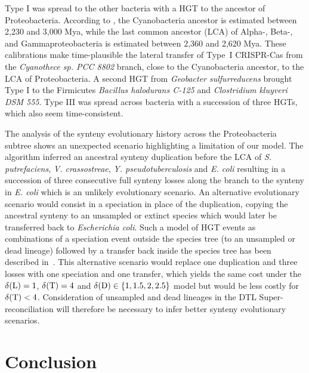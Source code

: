 Type I was spread to the other bacteria with a HGT to the ancestor of Proteobacteria.
According to \textcite{Wang2020EvolutionaryTimelineGenomic}, the Cyanobacteria ancestor is estimated between 2,230 and 3,000 Mya, while the last common ancestor (LCA) of Alpha-, Beta-, and Gammaproteobacteria is estimated between 2,360 and 2,620 Mya.
These calibrations make time-plausible the lateral transfer of Type~I CRISPR-Cas from the \emph{Cyanothece sp. PCC 8802} branch, close to the Cyanobacteria ancestor, to the LCA of Proteobacteria.
A second HGT from \emph{Geobacter sulfurreducens} brought Type I to the Firmicutes \emph{Bacillus halodurans C-125} and \emph{Clostridium kluyveri DSM 555}.
Type III was spread across bacteria with a succession of three HGTs, which also seem time-consistent.

The analysis of the synteny evolutionary history across the Proteobacteria subtree shows an unexpected scenario highlighting a limitation of our model.
The {\superdtl} algorithm inferred an ancestral synteny duplication before the LCA of \emph{S. putrefaciens}, \emph{V. crassostreae}, \emph{Y. pseudotuberculosis} and \emph{E. coli} resulting in a succession of three consecutive full synteny losses along the branch to the synteny in \emph{E. coli} which is an unlikely evolutionary scenario.
An alternative evolutionary scenario would consist in a speciation in place of the duplication, copying the ancestral synteny to an unsampled or extinct species which would later be transferred back to \emph{Escherichia coli}.
Such a model of HGT events as combinations of a speciation event outside the species tree (to an unsampled or dead lineage) followed by a transfer back inside the species tree has been described in~\textcite{Szoelloesi2013LateralGeneTransfer}.
This alternative scenario would replace one duplication and three losses with one speciation and one transfer, which yields the same cost under the \(\delta\kern.1pt(\mathrm{L}) = 1\), \(\delta\kern.1pt(\mathrm{T}) = 4\) and \(\delta\kern.1pt(\mathrm{D}) \in \{1, 1.5, 2, 2.5\}\) model but would be less costly for \(\delta\kern.1pt(\mathrm{T}) < 4\).
Consideration of unsampled and dead lineages in the DTL Super-reconciliation will therefore be necessary to infer better synteny evolutionary scenarios.

\section{Conclusion}

